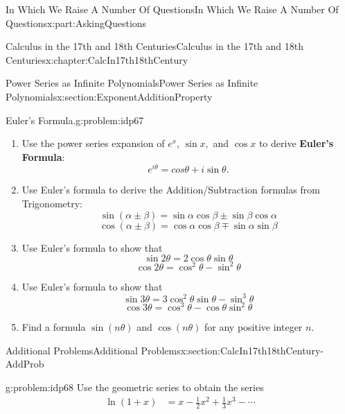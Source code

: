 \documentclass[oneside,10pt,]{book}
\newcommand{\terminology}[1]{\textbf{#1}}
\numberwithin{equation}{section}
\newcommand{\amp}{&}
\begin{document}
\begin{partptx}{In Which We Raise A Number Of Questions}{}{In Which We Raise A Number Of Questions}{}{}{x:part:AskingQuestions}
\begin{chapterptx}{Calculus in the 17th and 18th Centuries}{}{Calculus in the 17th and 18th Centuries}{}{}{x:chapter:CalcIn17th18thCentury}
\begin{sectionptx}{Power Series as Infinite Polynomials}{}{Power Series as Infinite Polynomials}{}{}{x:section:ExponentAdditionProperty}
\begin{problem}{Euler's Formula.}{g:problem:idp67}
\begin{enumerate}[font=\bfseries,label=(\alph*),ref=\alph*]
\item{}Use  the power series expansion of \(e^x\), \(\sin x,\) and \(\cos x\) to derive \terminology{Euler's Formula}:%
\begin{equation*}
e^{i\theta} = cos\theta+i\sin\theta.
\end{equation*}
%
\item{}Use Euler's formula to derive the Addition\slash{}Subtraction formulas from Trigonometry:%
\begin{equation*}
\sin(\alpha\pm\beta) = \sin\alpha\cos\beta\pm\sin\beta\cos\alpha
\end{equation*}
%
\begin{equation*}
\cos(\alpha\pm\beta) = \cos\alpha\cos\beta\mp\sin\alpha\sin\beta
\end{equation*}
%
\item{}Use Euler's formula to show that%
\begin{equation*}
\sin 2\theta = 2\cos\theta\sin\theta
\end{equation*}
%
\begin{equation*}
\cos 2\theta =\cos^2\theta-\sin^2\theta
\end{equation*}
%
\item{}Use Euler's formula to show that%
\begin{equation*}
\sin 3\theta = 3\cos^2\theta\sin\theta-\sin^3\theta
\end{equation*}
%
\begin{equation*}
\cos 3\theta=\cos^3\theta-\cos\theta\sin^2\theta
\end{equation*}
%
\item{}Find a formula \(\sin(n\theta)\) and \(\cos(n\theta)\) for any positive integer \(n\).%
\end{enumerate}
\end{problem}
\end{sectionptx}
%
%
\typeout{************************************************}
\typeout{************************************************}
%
\begin{sectionptx}{Additional Problems}{}{Additional Problems}{}{}{x:section:CalcIn17th18thCentury-AddProb}
\begin{problem}{}{g:problem:idp68}%
 Use the geometric series to obtain the series%
\begin{align*}
\ln \left(1+x\right)\amp =x-\frac{1}{2}x^2+\frac{1}{3}x^3-\cdots\\

\end{align*}
\end{problem}
\end{sectionptx}
\end{chapterptx}
\end{partptx}
\end{document}
